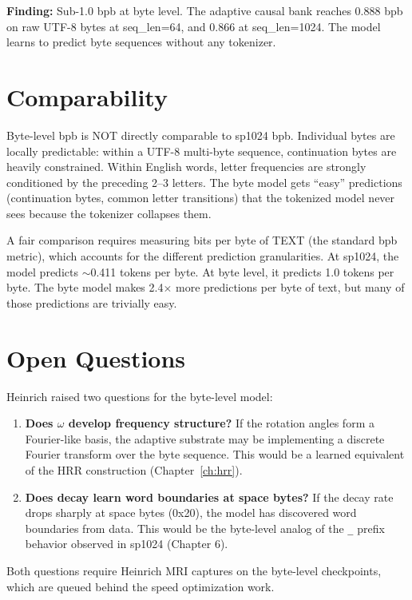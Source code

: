 \documentclass[11pt,a4paper]{report}
\newcommand{\finding}[1]{\textcolor{finding}{\textbf{Finding:}} #1}
\begin{document}
\finding{Sub-1.0 bpb at byte level.} The adaptive causal bank reaches 0.888 bpb on raw UTF-8 bytes at seq\_len=64, and 0.866 at seq\_len=1024. The model learns to predict byte sequences without any tokenizer.

\section{Comparability}

Byte-level bpb is NOT directly comparable to sp1024 bpb. Individual bytes are locally predictable: within a UTF-8 multi-byte sequence, continuation bytes are heavily constrained. Within English words, letter frequencies are strongly conditioned by the preceding 2--3 letters. The byte model gets ``easy'' predictions (continuation bytes, common letter transitions) that the tokenized model never sees because the tokenizer collapses them.

A fair comparison requires measuring bits per byte of TEXT (the standard bpb metric), which accounts for the different prediction granularities. At sp1024, the model predicts $\sim$0.411 tokens per byte. At byte level, it predicts 1.0 tokens per byte. The byte model makes 2.4$\times$ more predictions per byte of text, but many of those predictions are trivially easy.

\section{Open Questions}

Heinrich raised two questions for the byte-level model:

\begin{enumerate}[nosep]
\item \textbf{Does $\omega$ develop frequency structure?} If the rotation angles form a Fourier-like basis, the adaptive substrate may be implementing a discrete Fourier transform over the byte sequence. This would be a learned equivalent of the HRR construction (Chapter~\ref{ch:hrr}).

\item \textbf{Does decay learn word boundaries at space bytes?} If the decay rate drops sharply at space bytes (0x20), the model has discovered word boundaries from data. This would be the byte-level analog of the \texttt{\_} prefix behavior observed in sp1024 (Chapter 6).
\end{enumerate}

Both questions require Heinrich MRI captures on the byte-level checkpoints, which are queued behind the speed optimization work.
\end{document}
